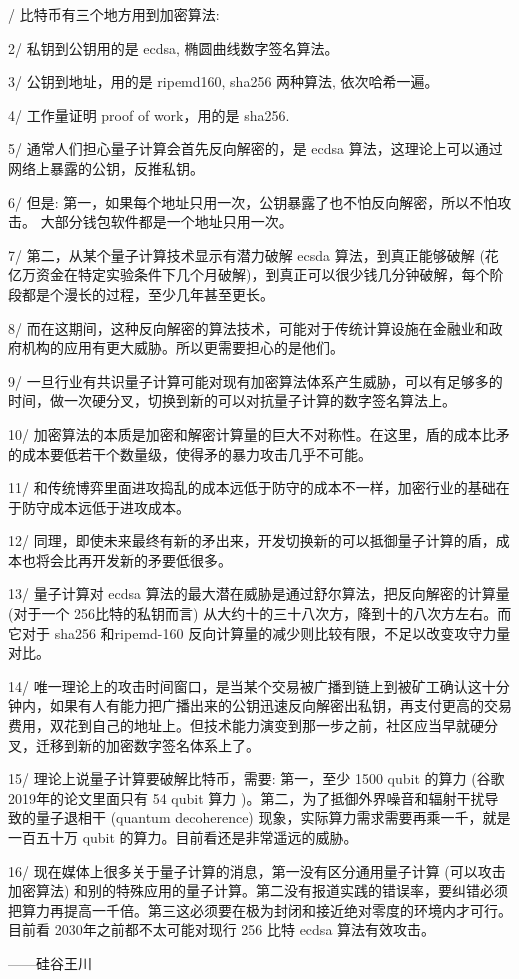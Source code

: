 \documentclass[UTF8, 12pt, a4paper]{ctexrep}
\begin{document}
{/ 比特币有三个地方用到加密算法:

2/ 私钥到公钥用的是 ecdsa, 椭圆曲线数字签名算法。

3/ 公钥到地址，用的是 ripemd160, sha256 两种算法, 依次哈希一遍。

4/ 工作量证明 proof of work，用的是 sha256.

5/ 通常人们担心量子计算会首先反向解密的，是 ecdsa 算法，这理论上可以通过网络上暴露的公钥，反推私钥。

6/ 但是: 第一，如果每个地址只用一次，公钥暴露了也不怕反向解密，所以不怕攻击。 大部分钱包软件都是一个地址只用一次。

7/ 第二，从某个量子计算技术显示有潜力破解 ecsda 算法，到真正能够破解 (花亿万资金在特定实验条件下几个月破解)，到真正可以很少钱几分钟破解，每个阶段都是个漫长的过程，至少几年甚至更长。

8/ 而在这期间，这种反向解密的算法技术，可能对于传统计算设施在金融业和政府机构的应用有更大威胁。所以更需要担心的是他们。

9/ 一旦行业有共识量子计算可能对现有加密算法体系产生威胁，可以有足够多的时间，做一次硬分叉，切换到新的可以对抗量子计算的数字签名算法上。

10/ 加密算法的本质是加密和解密计算量的巨大不对称性。在这里，盾的成本比矛的成本要低若干个数量级，使得矛的暴力攻击几乎不可能。

11/ 和传统博弈里面进攻捣乱的成本远低于防守的成本不一样，加密行业的基础在于防守成本远低于进攻成本。

12/ 同理，即使未来最终有新的矛出来，开发切换新的可以抵御量子计算的盾，成本也将会比再开发新的矛要低很多。

13/ 量子计算对 ecdsa 算法的最大潜在威胁是通过舒尔算法，把反向解密的计算量 (对于一个 256比特的私钥而言) 从大约十的三十八次方，降到十的八次方左右。而它对于 sha256 和ripemd-160 反向计算量的减少则比较有限，不足以改变攻守力量对比。

14/ 唯一理论上的攻击时间窗口，是当某个交易被广播到链上到被矿工确认这十分钟内，如果有人有能力把广播出来的公钥迅速反向解密出私钥，再支付更高的交易费用，双花到自己的地址上。但技术能力演变到那一步之前，社区应当早就硬分叉，迁移到新的加密数字签名体系上了。

15/ 理论上说量子计算要破解比特币，需要: 第一，至少 1500 qubit 的算力 (谷歌 2019年的论文里面只有 54 qubit 算力 )。第二，为了抵御外界噪音和辐射干扰导致的量子退相干 (quantum decoherence) 现象，实际算力需求需要再乘一千，就是一百五十万 qubit 的算力。目前看还是非常遥远的威胁。

16/ 现在媒体上很多关于量子计算的消息，第一没有区分通用量子计算 (可以攻击加密算法) 和别的特殊应用的量子计算。第二没有报道实践的错误率，要纠错必须把算力再提高一千倍。第三这必须要在极为封闭和接近绝对零度的环境内才可行。目前看 2030年之前都不太可能对现行 256 比特 ecdsa 算法有效攻击。

——硅谷王川}
\end{document}
